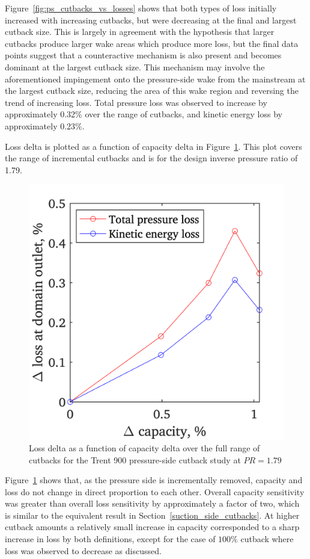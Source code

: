 \documentclass[a4paper, 11pt, oneside]{report}
\begin{document}
Figure~\ref{fig:ps_cutbacks_vs_losses} shows that both types of loss initially increased with increasing cutbacks, but were decreasing at the final and largest cutback size. This is largely in agreement with the hypothesis that larger cutbacks produce larger wake areas which produce more loss, but the final data points suggest that a counteractive mechanism is also present and becomes dominant at the largest cutback size. This mechanism may involve the aforementioned impingement onto the pressure-side wake from the mainstream at the largest cutback size, reducing the area of this wake region and reversing the trend of increasing loss. Total pressure loss was observed to increase by approximately 0.32\% over the range of cutbacks, and kinetic energy loss by approximately 0.23\%.

Loss delta is plotted as a function of capacity delta in Figure~\ref{fig:ps_capacities_vs_losses}. This plot covers the range of incremental cutbacks and is for the design inverse pressure ratio of 1.79.

\begin{figure}[H]
	\centering
	\includegraphics[width=.45\textwidth]{figs/ps_capacities_vs_losses.png}
	\caption{Loss delta as a function of capacity delta over the full range of cutbacks for the Trent 900 pressure-side cutback study at $PR=1.79$}
    \label{fig:ps_capacities_vs_losses}
\end{figure}

Figure~\ref{fig:ps_capacities_vs_losses} shows that, as the pressure side is incrementally removed, capacity and loss do not change in direct proportion to each other. Overall capacity sensitivity was greater than overall loss sensitivity by approximately a factor of two, which is similar to the equivalent result in Section~\ref{suction_side_cutbacks}. At higher cutback amounts a relatively small increase in capacity corresponded to a sharp increase in loss by both definitions, except for the case of $100\%$ cutback where loss was observed to decrease as discussed.
\end{document}
